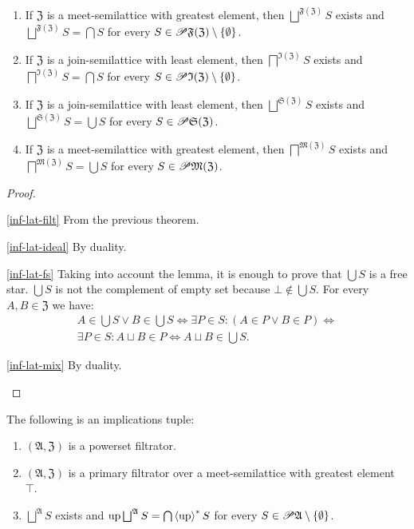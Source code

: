 \begin{thm}
~
\begin{enumerate}
\item \label{inf-lat-filt}If $\mathfrak{Z}$ is a meet-semilattice with
greatest element, then $\bigsqcup^{\mathfrak{F}(\mathfrak{Z})}S$
exists and $\bigsqcup^{\mathfrak{F}(\mathfrak{Z})}S=\bigcap S$ for
every $S\in\mathscr{P}\mathfrak{F}(\mathfrak{Z})\setminus\{\emptyset\}$.
\item \label{inf-lat-ideal}If $\mathfrak{Z}$ is a join-semilattice with
least element, then $\bigsqcap^{\mathfrak{I}(\mathfrak{Z})}S$ exists
and $\bigsqcap^{\mathfrak{I}(\mathfrak{Z})}S=\bigcap S$ for every
$S\in\mathscr{P}\mathfrak{I}(\mathfrak{Z})\setminus\{\emptyset\}$.
\item \label{inf-lat-fs}If $\mathfrak{Z}$ is a join-semilattice with least
element, then $\bigsqcup^{\mathfrak{S}(\mathfrak{Z})}S$ exists and
$\bigsqcup^{\mathfrak{S}(\mathfrak{Z})}S=\bigcup S$ for every $S\in\mathscr{P}\mathfrak{S}(\mathfrak{Z})$.
\item \label{inf-lat-mix}If $\mathfrak{Z}$ is a meet-semilattice with
greatest element, then $\bigsqcap^{\mathfrak{M}(\mathfrak{Z})}S$
exists and $\bigsqcap^{\mathfrak{M}(\mathfrak{Z})}S=\bigcup S$ for
every $S\in\mathscr{P}\mathfrak{M}(\mathfrak{Z})$.
\end{enumerate}
\end{thm}
\begin{proof}
~
\begin{widedisorder}
\item [{\ref{inf-lat-filt}}] From the previous theorem.
\item [{\ref{inf-lat-ideal}}] By duality.
\item [{\ref{inf-lat-fs}}] Taking into account the lemma, it is enough
to prove that $\bigcup S$ is a free star. $\bigcup S$ is not the
complement of empty set because $\bot\notin\bigcup S$. For every
$A,B\in\mathfrak{Z}$ we have:
\begin{multline*}
A\in\bigcup S\lor B\in\bigcup S\Leftrightarrow\exists P\in S:(A\in P\lor B\in P)\Leftrightarrow\\
\exists P\in S:A\sqcup B\in P\Leftrightarrow A\sqcup B\in\bigcup S.
\end{multline*}

\item [{\ref{inf-lat-mix}}] By duality.
\end{widedisorder}
\end{proof}
\begin{cor}
\label{f-join-form}The following is an implications tuple:
\begin{enumerate}
\item \label{f-join-form-p}$(\mathfrak{A},\mathfrak{Z})$ is a powerset
filtrator.
\item \label{f-join-form-fltr}$(\mathfrak{A},\mathfrak{Z})$ is a primary
filtrator over a meet-semilattice with greatest element~$\top$.
\item \label{f-join-form-conc}$\bigsqcup^{\mathfrak{A}}S$ exists and $\up\bigsqcup^{\mathfrak{A}}S=\bigcap\rsupfun{\up}S$
for every $S\in\mathscr{P}\mathfrak{A}\setminus\{\emptyset\}$.
\end{enumerate}
\end{cor}
